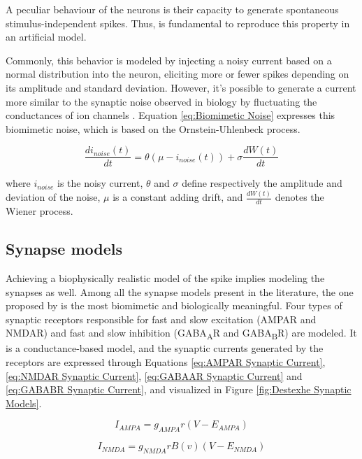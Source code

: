 A peculiar behaviour of the neurons is their capacity to generate spontaneous stimulus-independent spikes. Thus, is fundamental to reproduce this property in an artificial model. 

Commonly, this behavior is modeled by injecting a noisy current based on a normal distribution into the neuron, eliciting more or fewer spikes depending on its amplitude and standard deviation. However, it's possible to generate a current more similar to the synaptic noise observed in biology by fluctuating the conductances of ion channels \cite{Destexhe2001,Tuckwell2002}. Equation \ref{eq:Biomimetic Noise} expresses this biomimetic noise, which is based on the Ornstein-Uhlenbeck process.

\begin{equation}
\frac{di_{noise}(t)}{dt} = \theta(\mu-i_{noise}(t)) + \sigma\frac{dW(t)}{dt}
\label{eq:Biomimetic Noise}
\end{equation}

where $i_{noise}$ is the noisy current, $\theta$ and $\sigma$ define respectively the amplitude and deviation of the noise, $\mu$ is a constant adding drift, and $\frac{dW(t)}{dt}$ denotes the Wiener process.

\subsection{Synapse models}

Achieving a biophysically realistic model of the spike implies modeling the synapses as well. Among all the synapse models present in the literature, the one proposed by \cite{Destexhe1998} is the most biomimetic and biologically meaningful. Four types of synaptic receptors responsible for fast and slow excitation (AMPAR and NMDAR) and fast and slow inhibition (GABA\textsubscript{A}R and GABA\textsubscript{B}R) are modeled. It is a conductance-based model, and the synaptic currents generated by the receptors are expressed through Equations \ref{eq:AMPAR Synaptic Current}, \ref{eq:NMDAR Synaptic Current}, \ref{eq:GABAAR Synaptic Current} and \ref{eq:GABABR Synaptic Current}, and visualized in Figure \ref{fig:Destexhe Synaptic Models}.

\begin{equation}
I_{AMPA} = g_{AMPA} r (V-E_{AMPA})
\label{eq:AMPAR Synaptic Current}
\end{equation}

\begin{equation}
I_{NMDA} = g_{NMDA} r B(v) (V-E_{NMDA})
\label{eq:NMDAR Synaptic Current}
\end{equation}

